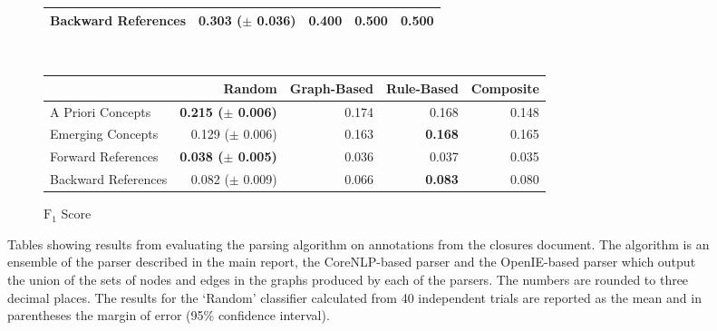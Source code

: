 \documentclass[12pt]{article}
\theoremstyle{grammarstyle}
\begin{document}
\begin{figure}[h]
\begin{subfigure}[b]{\textwidth}
\begin{tabular}{|l|r|r|r|r|}
            Backward References & 0.303 ($\pm$ 0.036) & 0.400 &       \textbf{0.500} &      \textbf{0.500} \\
            \hline
        \end{tabular}
    \end{subfigure} \\
    \begin{subfigure}[b]{\textwidth}
        \caption{$\text{F}_1$ Score}
        \label{fig:ensemble_f1_score}
        \centering
        \begin{tabular}{|l|r|r|r|r|}
            \hline
            {} & Random & Graph-Based & Rule-Based & Composite \\
            \hline
            A Priori Concepts &  \textbf{0.215 ($\pm$ 0.006)} & 0.174 & 0.168 & 0.148 \\
            Emerging Concepts & 0.129 ($\pm$ 0.006) & 0.163 &       \textbf{0.168} & 0.165 \\
            \hline
            Forward References &  \textbf{0.038 ($\pm$ 0.005)} & 0.036 & 0.037 & 0.035 \\
            Backward References & 0.082 ($\pm$ 0.009) & 0.066 &       \textbf{0.083} & 0.080 \\
            \hline
        \end{tabular}
    \end{subfigure}
    \caption{Tables showing results from evaluating the parsing algorithm on annotations from the closures document. The algorithm is an ensemble of the parser described in the main report, the CoreNLP-based parser and the OpenIE-based parser which output the union of the sets of nodes and edges in the graphs produced by each of the parsers. The numbers are rounded to three decimal places. The results for the `Random' classifier calculated from 40 independent trials are reported as the mean and in parentheses the margin of error (95\% confidence interval).}
    \label{fig:ensemble_parser_results}
\end{figure}

\clearpage
\end{document}
